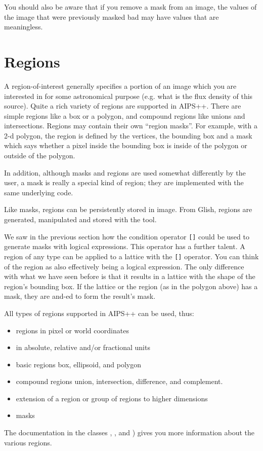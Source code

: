 \medskip\noindent You should also be aware that if you remove a mask from an image,
the values of the image that were previously masked bad 
may have values that are meaningless.


\section{\label{LEL:REGIONS}Regions}

A region-of-interest generally specifies a portion of an image which you
are interested in for some astronomical purpose (e.g.  what is the flux
density of this source).  Quite a rich variety of regions are supported
in AIPS++.  There are simple regions like a box or a polygon, and
compound regions like unions and intersections.  Regions may contain
their own ``region masks''.  For example, with a 2-d polygon, the region is defined
by the vertices, the bounding box and a mask which says whether a pixel
inside the bounding box is inside of the polygon or outside of the
polygon. 

\medskip\noindent In addition, although masks and regions are used somewhat differently by
the user, a mask is really a special kind of region; they are implemented
with the same underlying code.

\medskip\noindent Like masks, regions can be persistently stored in image.  From Glish,
regions are generated, manipulated and stored with the
 tool.

\medskip\noindent We saw in the previous section how the condition operator {\tt []} could
be used to generate masks with logical expressions.  This operator has a
further talent.  A region of any type can be applied to a lattice with
the {\tt []} operator.  You can think of the region as also effectively
being a logical expression.  The only difference with what we have seen
before is that it results in a lattice with the shape of the region's
bounding box.  If the lattice or the region (as in the polygon above)
has a mask, they are and-ed to form the result's mask. 

\medskip\noindent All types of regions supported in AIPS++ can be used, thus:

\begin{itemize}
\item regions in pixel or world coordinates
\item in absolute, relative and/or fractional units
\item basic regions box, ellipsoid, and polygon
\item compound regions union, intersection, difference, and complement.
\item extension of a region or group of regions to higher dimensions
\item masks
\end{itemize}
The documentation in the classes
 ,
 , and
 )
gives you more information about the various regions.

